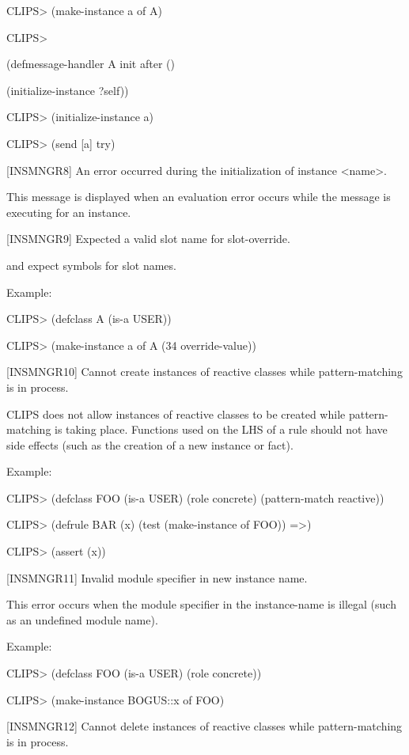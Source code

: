 \documentclass[letterpaper,10pt,english]{sphinxmanual}
\begin{document}
CLIPS\textgreater{} (make-instance a of A)

CLIPS\textgreater{}

(defmessage-handler A init after ()

(initialize-instance ?self))

CLIPS\textgreater{} (initialize-instance a)

CLIPS\textgreater{} (send {[}a{]} try)

{[}INSMNGR8{]} An error occurred during the initialization of instance
\textless{}name\textgreater{}.

This message is displayed when an evaluation error occurs while the
 message is executing for an instance.

{[}INSMNGR9{]} Expected a valid slot name for slot-override.

 and  expect symbols for slot
names.

Example:

CLIPS\textgreater{} (defclass A (is-a USER))

CLIPS\textgreater{} (make-instance a of A (34 override-value))

{[}INSMNGR10{]} Cannot create instances of reactive classes while
pattern-matching is in process.

CLIPS does not allow instances of reactive classes to be created while
pattern-matching is taking place. Functions used on the LHS of a rule
should not have side effects (such as the creation of a new instance or
fact).

Example:

CLIPS\textgreater{} (defclass FOO (is-a USER) (role concrete) (pattern-match
reactive))

CLIPS\textgreater{} (defrule BAR (x) (test (make-instance of FOO)) =\textgreater{})

CLIPS\textgreater{} (assert (x))

{[}INSMNGR11{]} Invalid module specifier in new instance name.

This error occurs when the module specifier in the instance-name is
illegal (such as an undefined module name).

Example:

CLIPS\textgreater{} (defclass FOO (is-a USER) (role concrete))

CLIPS\textgreater{} (make-instance BOGUS::x of FOO)

{[}INSMNGR12{]} Cannot delete instances of reactive classes while
pattern-matching is in process.
\end{document}
